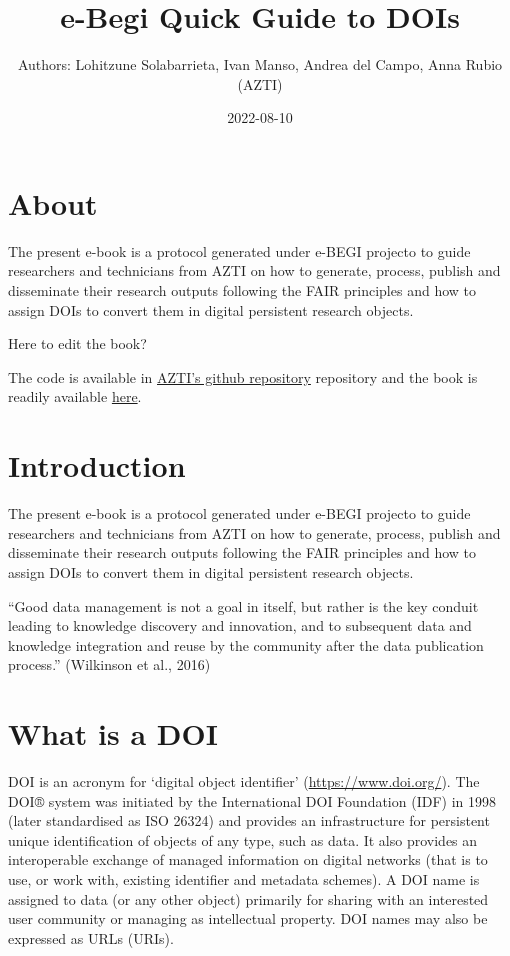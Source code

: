 \documentclass[
]{book}
\title{e-Begi Quick Guide to DOIs}
\author{Authors: Lohitzune Solabarrieta, Ivan Manso, Andrea del Campo, Anna Rubio (AZTI)}
\date{2022-08-10}
\begin{document}
\maketitle

{
\setcounter{tocdepth}{1}
\tableofcontents
}
\hypertarget{about}{%
\chapter*{About}\label{about}}

The present e-book is a protocol generated under e-BEGI projecto to guide researchers and technicians from AZTI on how to generate, process, publish and disseminate their research outputs following the FAIR principles and how to assign DOIs to convert them in digital persistent research objects.

Here to edit the book?

The code is available in \href{https://github.com/Fundacion-AZTI/ebegi_quickguide2DOIs}{AZTI's github repository} repository and the book is readily available \href{https://fundacion-azti.github.io/ebegi_quickguide2DOIs/}{here}.

\hypertarget{introduction}{%
\chapter{Introduction}\label{introduction}}

The present e-book is a protocol generated under e-BEGI projecto to guide researchers and technicians from AZTI on how to generate, process, publish and disseminate their research outputs following the FAIR principles and how to assign DOIs to convert them in digital persistent research objects.

``Good data management is not a goal in itself, but rather is the key conduit leading to knowledge discovery and innovation, and to subsequent data and knowledge integration and reuse by the community after the data publication process.'' (Wilkinson et al., 2016)

\hypertarget{what-is-a-doi}{%
\chapter{What is a DOI}\label{what-is-a-doi}}

DOI is an acronym for `digital object identifier' (\url{https://www.doi.org/}). The DOI® system was initiated by the International DOI Foundation (IDF) in 1998 (later standardised as ISO 26324) and provides an infrastructure for persistent unique identification of objects of any type, such as data. It also provides an interoperable exchange of managed information on digital networks (that is to use, or work with, existing identifier and metadata schemes). A DOI name is assigned to data (or any other object) primarily for sharing with an interested user community or managing as intellectual property. DOI names may also be expressed as URLs (URIs).
\end{document}
